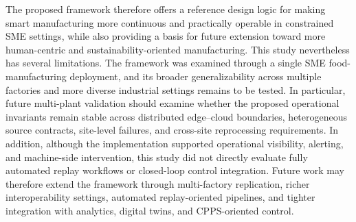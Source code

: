 \documentclass[systems,article,accept,pdftex,moreauthors]{Definitions/mdpi}
\begin{document}
The proposed framework therefore offers a reference design logic for making smart manufacturing more continuous and practically operable in constrained SME settings, while also providing a basis for future extension toward more human-centric and sustainability-oriented manufacturing. This study nevertheless has several limitations. The framework was examined through a single SME food-manufacturing deployment, and its broader generalizability across multiple factories and more diverse industrial settings remains to be tested. In particular, future multi-plant validation should examine whether the proposed operational invariants remain stable across distributed edge--cloud boundaries, heterogeneous source contracts, site-level failures, and cross-site reprocessing requirements. In addition, although the implementation supported operational visibility, alerting, and machine-side intervention, this study did not directly evaluate fully automated replay workflows or closed-loop control integration. Future work may therefore extend the framework through multi-factory replication, richer interoperability settings, automated replay-oriented pipelines, and tighter integration with analytics, digital twins, and CPPS-oriented control.

\vspace{6pt} 

\newpage

\end{document}
